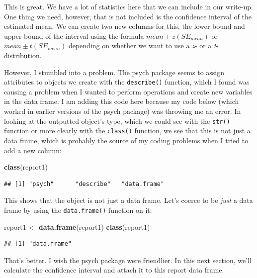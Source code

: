 \documentclass[
]{article}
\newenvironment{Shaded}{\begin{snugshade}}{\end{snugshade}}
\newcommand{\KeywordTok}[1]{\textcolor[rgb]{0.13,0.29,0.53}{\textbf{#1}}}
\newcommand{\NormalTok}[1]{#1}
\newcommand{\StringTok}[1]{\textcolor[rgb]{0.31,0.60,0.02}{#1}}
\begin{document}
This is great. We have a lot of statistics here that we can include in our write-up. One thing we need, however, that is not included is the confidence interval of the estimated mean. We can create two new columns for this, the lower bound and upper bound of the interval using the formula \(mean \pm z(SE_{mean})\) or \(mean \pm t(SE_{mean})\) depending on whether we want to use a \emph{z}- or a \emph{t}-distribution.

However, I stumbled into a problem. The psych package seems to assign attributes to objects we create with the \texttt{describe()} function, which I found was causing a problem when I wanted to perform operations and create new variables in the data frame. I am adding this code here because my code below (which worked in earlier versions of the psych package) was throwing me an error. In looking at the outputted object's type, which we could see with the \texttt{str()} function or more clearly with the \texttt{class()} function, we see that this is not just a data frame, which is probably the source of my coding problems when I tried to add a new column:

\begin{Shaded}
\begin{Highlighting}[]
\KeywordTok{class}\NormalTok{(report1)}
\end{Highlighting}
\end{Shaded}

\begin{verbatim}
## [1] "psych"      "describe"   "data.frame"
\end{verbatim}

This shows that the object is not just a data frame. Let's coerce to be \emph{just} a data frame by using the \texttt{data.frame()} function on it:

\begin{Shaded}
\begin{Highlighting}[]
\NormalTok{report1 <-}\StringTok{ }\KeywordTok{data.frame}\NormalTok{(report1)}
\KeywordTok{class}\NormalTok{(report1)}
\end{Highlighting}
\end{Shaded}

\begin{verbatim}
## [1] "data.frame"
\end{verbatim}

That's better. I wish the psych package were friendlier. In this next section, we'll calculate the confidence interval and attach it to this report data frame.
\end{document}
